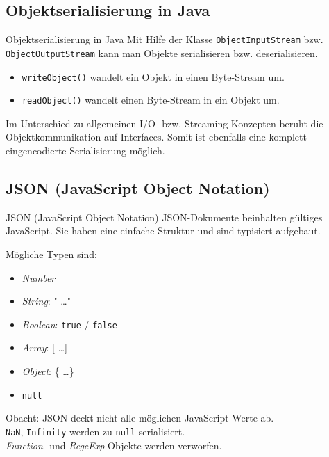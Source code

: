 \subsection{Objektserialisierung in Java}

\begin{bonus}{Objektserialisierung in Java}
    Mit Hilfe der Klasse \texttt{ObjectInputStream} bzw. \texttt{ObjectOutputStream} kann man Objekte serialisieren bzw. deserialisieren.

    \begin{itemize}
        \item \texttt{writeObject()} wandelt ein Objekt in einen Byte-Stream um.
        \item \texttt{readObject()} wandelt einen Byte-Stream in ein Objekt um.
    \end{itemize}

    Im Unterschied zu allgemeinen I/O- bzw. Streaming-Konzepten beruht die Objektkommunikation auf Interfaces.
    Somit ist ebenfalls eine komplett eingencodierte Serialisierung möglich.
\end{bonus}

\subsection{JSON (JavaScript Object Notation)}

\begin{defi}{JSON (JavaScript Object Notation)}
    JSON-Dokumente beinhalten gültiges JavaScript.
    Sie haben eine einfache Struktur und sind typisiert aufgebaut.

    Mögliche Typen sind:
    \begin{itemize}
        \item \emph{Number}
        \item \emph{String}: " \ldots "
        \item \emph{Boolean}: \texttt{true} / \texttt{false}
        \item \emph{Array}: [ \ldots ]
        \item \emph{Object}: \{ \ldots \}
        \item \texttt{null}
    \end{itemize}

    Obacht: JSON deckt nicht alle möglichen JavaScript-Werte ab.\\
    \texttt{NaN}, \texttt{Infinity} werden zu \texttt{null} serialisiert.\\
    \emph{Function}- und \emph{RegeExp}-Objekte werden verworfen.
\end{defi}

